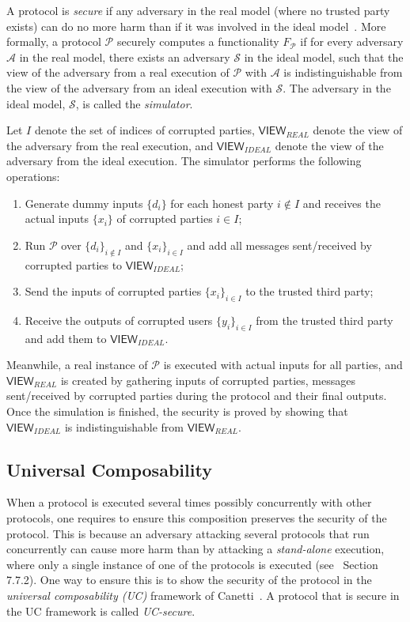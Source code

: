 \documentclass[11pt]{article}
\theoremstyle{plain}
\begin{document}
A protocol is \emph{secure} if any adversary in the real model (where
no trusted party exists) can do no more harm than if it was involved
in the ideal model~\cite[Section 4.3]{Goldreich:2000:FCB:519078}.
More formally, a protocol $\mathcal{P}$ securely computes a functionality
$F_{\mathcal{P}}$ if for every adversary $\mathcal{A}$ in the real
model, there exists an adversary $\mathcal{S}$ in the ideal model,
such that the view of the adversary from a real execution of $\mathcal{P}$
with $\mathcal{A}$ is indistinguishable from the view of the adversary
from an ideal execution with $\mathcal{S}$. The adversary in the
ideal model, $\mathcal{S}$, is called the \emph{simulator}.

Let $I$ denote the set of indices of corrupted parties, $\mathsf{VIEW}_{REAL}$
denote the view of the adversary from the real execution, and $\mathsf{VIEW}_{IDEAL}$
denote the view of the adversary from the ideal execution. The simulator
performs the following operations:
\begin{enumerate}
	\item Generate dummy inputs $\{d_{i}\}$ for each honest party $i\notin I$
	and receives the actual inputs $\{x_{i}\}$ of corrupted parties $i\in I$;
	\item Run $\mathcal{P}$ over $\{d_{i}\}_{i\notin I}$ and $\{x_{i}\}_{i\in I}$
	and add all messages sent/received by corrupted parties to $\mathsf{VIEW}_{IDEAL}$;
	\item Send the inputs of corrupted parties $\{x_{i}\}_{i\in I}$ to the
	trusted third party;
	\item Receive the outputs of corrupted users $\{y_{i}\}_{i\in I}$ from
	the trusted third party and add them to $\mathsf{VIEW}_{IDEAL}$.
\end{enumerate}
Meanwhile, a real instance of $\mathcal{P}$ is executed with actual
inputs for all parties, and $\mathsf{VIEW}_{REAL}$ is created by
gathering inputs of corrupted parties, messages sent/received by corrupted
parties during the protocol and their final outputs. Once the simulation
is finished, the security is proved by showing that $\mathsf{VIEW}_{IDEAL}$
is indistinguishable from $\mathsf{VIEW}_{REAL}$.

\subsection{Universal Composability}

When a protocol is executed several times possibly concurrently with
other protocols, one requires to ensure this composition preserves
the security of the protocol. This is because an adversary attacking
several protocols that run concurrently can cause more harm than by
attacking a \emph{stand-alone} execution, where only a single instance
of one of the protocols is executed (see~\cite{Goldreich:2004:FCV:975541}
Section 7.7.2). One way to ensure this is to show the security of
the protocol in the \emph{universal composability (UC)} framework
of Canetti~\cite{Canetti:UCSecurity:2001}. A protocol that is secure
in the UC framework is called \emph{UC-secure}.
\end{document}
